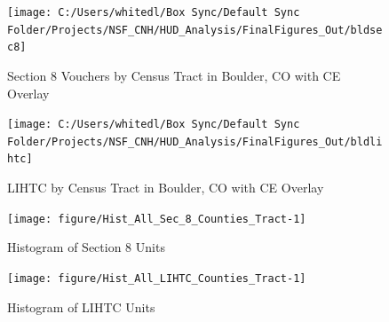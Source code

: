 \documentclass{article}\usepackage[]{graphicx}\usepackage[]{color}
\newenvironment{knitrout}{}{} %
\begin{document}
\pagebreak
\newpage
\FloatBarrier

\begin{knitrout}
\color{fgcolor}\begin{figure}
\texttt{[image: C:/Users/whitedl/Box Sync/Default Sync Folder/Projects/NSF\_CNH/HUD\_Analysis/FinalFigures\_Out/bldsec8]} \caption[Section 8 Vouchers by Census Tract in Boulder, CO with CE Overlay]{Section 8 Vouchers by Census Tract in Boulder, CO with CE Overlay}\label{fig:Example_County_Census_Sec8}
\end{figure}


\end{knitrout}

\begin{knitrout}
\color{fgcolor}\begin{figure}
\texttt{[image: C:/Users/whitedl/Box Sync/Default Sync Folder/Projects/NSF\_CNH/HUD\_Analysis/FinalFigures\_Out/bldlihtc]} \caption[LIHTC by Census Tract in Boulder, CO with CE Overlay]{LIHTC by Census Tract in Boulder, CO with CE Overlay}\label{fig:Example_County_Census_LITHC}
\end{figure}


\end{knitrout}
 
\pagebreak
\newpage
\FloatBarrier 
 
\begin{knitrout}
\color{fgcolor}\begin{figure}
\texttt{[image: figure/Hist\_All\_Sec\_8\_Counties\_Tract-1]} \caption[Histogram of Section 8 Units]{Histogram of Section 8 Units}\label{fig:Hist_All_Sec_8_Counties_Tract}
\end{figure}


\end{knitrout}


\begin{knitrout}
\color{fgcolor}\begin{figure}
\texttt{[image: figure/Hist\_All\_LIHTC\_Counties\_Tract-1]} \caption[Histogram of LIHTC Units]{Histogram of LIHTC Units}\label{fig:Hist_All_LIHTC_Counties_Tract}
\end{figure}


\end{knitrout}
\end{document}
